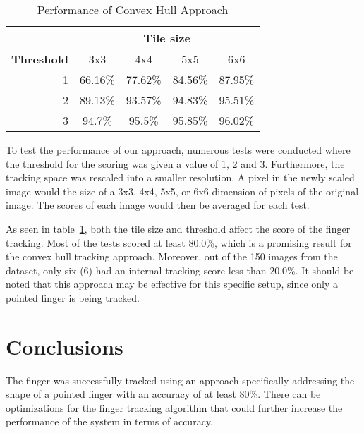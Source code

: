 \documentclass{acm_proc_article-sp}
\begin{document}
\begin{table}[h]
\centering
\caption{Performance of Convex Hull Approach}
\begin{tabular}{r|c|c|c|c|}
\cline{2-5}
\multicolumn{1}{c|}{}                    & \multicolumn{4}{c|}{\textbf{Tile size}} \\ \hline
\multicolumn{1}{|l|}{\textbf{Threshold}} & 3x3      & 4x4      & 5x5     & 6x6     \\ \hline
\multicolumn{1}{|r|}{1}                  & 66.16\%  & 77.62\%  & 84.56\% & 87.95\% \\ \hline
\multicolumn{1}{|r|}{2}                  & 89.13\%  & 93.57\%  & 94.83\% & 95.51\% \\ \hline
\multicolumn{1}{|r|}{3}                  & 94.7\%   & 95.5\%   & 95.85\% & 96.02\%   \\ \hline
\end{tabular}
\label{table:performance}
\end{table}

To test the performance of our approach, numerous tests were conducted where the threshold for the scoring was given a value of 1, 2 and 3. Furthermore, the tracking space was rescaled into a smaller resolution. A pixel in the newly scaled image would the size of a 3x3, 4x4, 5x5, or 6x6 dimension of pixels of the original image. The scores of each image would then be averaged for each test.

As seen in table~\ref{table:performance}, both the tile size and threshold affect the score of the finger tracking. Most of the tests scored at least 80.0\%, which is a promising result for the convex hull tracking approach. Moreover, out of the 150 images from the dataset, only six (6) had an internal tracking score less than 20.0\%. It should be noted that this approach may be effective for this specific setup, since only a pointed finger is being tracked.

\section{Conclusions}

The finger was successfully tracked using an approach specifically addressing the shape of a pointed finger with an accuracy of at least 80\%. There can be optimizations for the finger tracking algorithm that could further increase the performance of the system in terms of accuracy.

\end{document}
